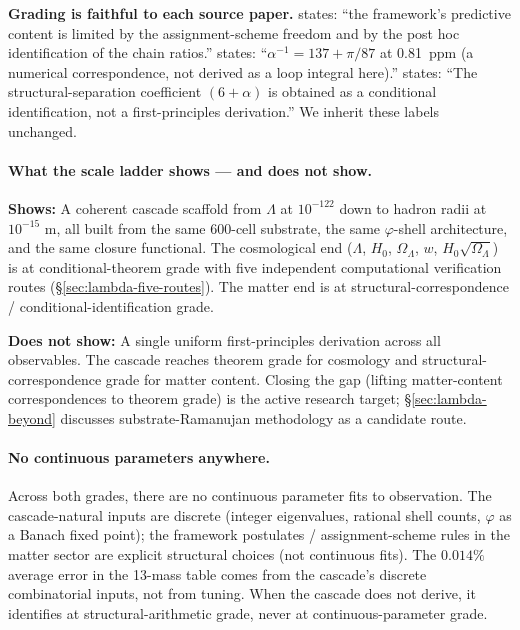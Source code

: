 \documentclass[11pt]{article}
\theoremstyle{plain}
\theoremstyle{definition}
\theoremstyle{remark}
\begin{document}
\textbf{Grading is faithful to each source paper.} \citet{SmartV} states: ``the framework's predictive content is limited by the assignment-scheme freedom and by the post hoc identification of the chain ratios.'' \citet{SmartXXII} states: ``$\alpha^{-1} = 137 + \pi/87$ at 0.81~ppm (a numerical correspondence, not derived as a loop integral here).'' \citet{SmartXXXII} states: ``The structural-separation coefficient $(6+\alpha)$ is obtained as a conditional identification, not a first-principles derivation.'' We inherit these labels unchanged.

\paragraph{What the scale ladder shows --- and does not show.}
\textbf{Shows:} A coherent cascade scaffold from $\Lambda$ at $10^{-122}$ down to hadron radii at $10^{-15}$ m, all built from the same 600-cell substrate, the same $\varphi$-shell architecture, and the same closure functional. The cosmological end ($\Lambda$, $H_0$, $\Omega_\Lambda$, $w$, $H_0\sqrt{\Omega_\Lambda}$) is at conditional-theorem grade with five independent computational verification routes (\S\ref{sec:lambda-five-routes}). The matter end is at structural-correspondence / conditional-identification grade.

\textbf{Does not show:} A single uniform first-principles derivation across all observables. The cascade reaches theorem grade for cosmology and structural-correspondence grade for matter content. Closing the gap (lifting matter-content correspondences to theorem grade) is the active research target; \S\ref{sec:lambda-beyond} discusses substrate-Ramanujan methodology as a candidate route.

\paragraph{No continuous parameters anywhere.} Across both grades, there are no continuous parameter fits to observation. The cascade-natural inputs are discrete (integer eigenvalues, rational shell counts, $\varphi$ as a Banach fixed point); the framework postulates / assignment-scheme rules in the matter sector are explicit structural choices (not continuous fits). The $0.014\%$ average error in the 13-mass table comes from the cascade's discrete combinatorial inputs, not from tuning. When the cascade does not derive, it identifies at structural-arithmetic grade, never at continuous-parameter grade.
\end{document}
